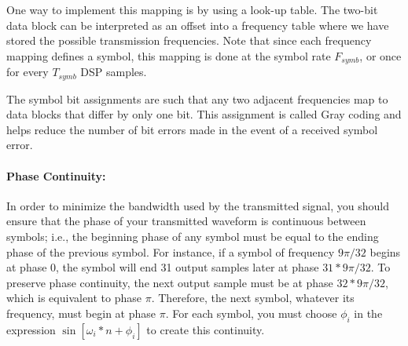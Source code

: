 One way to implement this mapping is by using a look-up table.  
The two-bit data block can be interpreted as an offset into a 
frequency table where we have stored the possible transmission 
frequencies.  Note that since each frequency mapping defines a 
symbol, this mapping is done at the symbol rate $F_{symb}$, or once 
for every $T_{symb}$ DSP samples.

The symbol bit assignments are such that
any two adjacent frequencies map to data blocks that differ by 
only one bit.  This assignment is called Gray coding and 
helps reduce the number of bit errors made in the event of a 
received symbol error.

\paragraph{Phase Continuity:}
In order to minimize the bandwidth used by the transmitted signal, 
you should ensure that the phase of your transmitted waveform is 
continuous between symbols; i.e., the beginning phase of any symbol 
must be equal to the ending phase of the previous symbol.
For instance, if a symbol of frequency $9\pi/32$ begins at 
phase 0, the symbol will end 31 output samples later
at phase $31*9\pi/32$.  To preserve phase continuity, the next 
output sample must be at phase $32*9\pi/32$, which is 
equivalent to phase $\pi$.  Therefore, the next symbol, 
whatever its frequency, must begin at phase $\pi$.  For each symbol, 
you must choose $\phi_i$ in the expression 
$\sin[\omega_i * n + \phi_i]$ to create this continuity.


